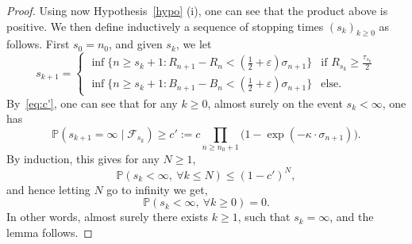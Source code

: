 \documentclass[10pt,a4paper]{amsart}
\newcommand{\1}{{\text{\Large $\mathfrak 1$}}}
\begin{document}
\begin{proof}
Using now Hypothesis~\ref{hypo} (i), one can see that the product above is positive. We then define inductively a sequence of stopping times $(s_k)_{k\ge 0}$ as follows. First $s_0 = n_0$, 
and given $s_k$, we let 
\begin{equation*}
s_{k+1} = \left\{ 
\begin{array}{ll}
\inf\{n \ge s_k+1 : R_{n+1} - R_n < (\frac 12 + \varepsilon) \sigma_{n+1}\} & \text{if }R_{s_k}\ge \frac{\tau_{s_k}}{2} \\
 \inf\{n \ge s_k+1 : B_{n+1} - B_n < (\frac 12 + \varepsilon) \sigma_{n+1}\} & \text{else.} 
\end{array}
\right. 
\end{equation*}
By~\eqref{eq:c'}, one can see that for any $k\ge 0$, almost surely on the event $s_k<\infty$, one has 
$$\mathbb P(s_{k+1} = \infty \mid \mathcal F_{s_k}) \ge c':=  c \prod_{n\ge n_0+1} \big(1-\exp(- \kappa \cdot\sigma_{n+1})\big). $$ 
By induction, this gives for any $N\ge 1$,
$$\mathbb P(s_k<\infty, \ \forall k\le N) \le (1- c')^N,$$
and hence letting $N$ go to infinity we get, 
$$\mathbb P(s_k<\infty, \ \forall k\ge 0) = 0. $$ 
In other words, almost surely there exists $k\ge 1$, such that $s_k= \infty$, and the lemma follows.   
\end{proof}
\end{document}
